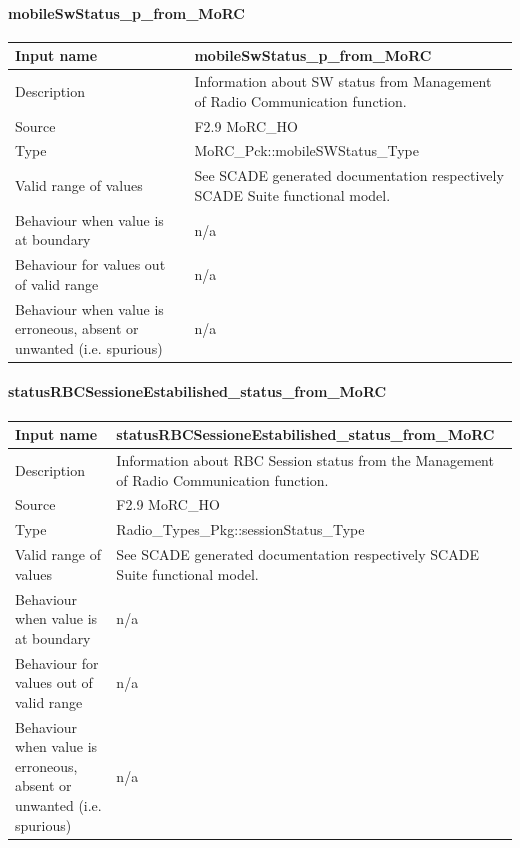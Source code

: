 \paragraph{mobileSwStatus\_p\_from\_MoRC}

\begin{longtable}{p{}p{}}
\toprule
Input name				& mobileSwStatus\_p\_from\_MoRC  \\
\midrule
Description				& Information about SW status from Management of Radio Communication function. \\
\midrule
Source					& F2.9 MoRC\_HO\\ 
\midrule
Type					& MoRC\_Pck::mobileSWStatus\_Type \\
\midrule
Valid range of values	& See SCADE generated documentation respectively SCADE Suite functional model. \\
\midrule
Behaviour when value is at boundary	&n/a \\
\midrule
Behaviour for values out of valid range	& n/a \\
\midrule
Behaviour when value is erroneous, absent or unwanted (i.e. spurious) & n/a \\
\bottomrule
\end{longtable}

\paragraph{statusRBCSessioneEstabilished\_status\_from\_MoRC}

\begin{longtable}{p{}p{}}
\toprule
Input name				& statusRBCSessioneEstabilished\_status\_from\_MoRC  \\
\midrule
Description				& Information about RBC Session status from the Management of Radio Communication function. \\
\midrule
Source					&  F2.9 MoRC\_HO\\ 
\midrule
Type					& Radio\_Types\_Pkg::sessionStatus\_Type \\
\midrule
Valid range of values	& See SCADE generated documentation respectively SCADE Suite functional model. \\
\midrule
Behaviour when value is at boundary	& n/a \\
\midrule
Behaviour for values out of valid range	& n/a \\
\midrule
Behaviour when value is erroneous, absent or unwanted (i.e. spurious) & n/a \\
\bottomrule
\end{longtable}

